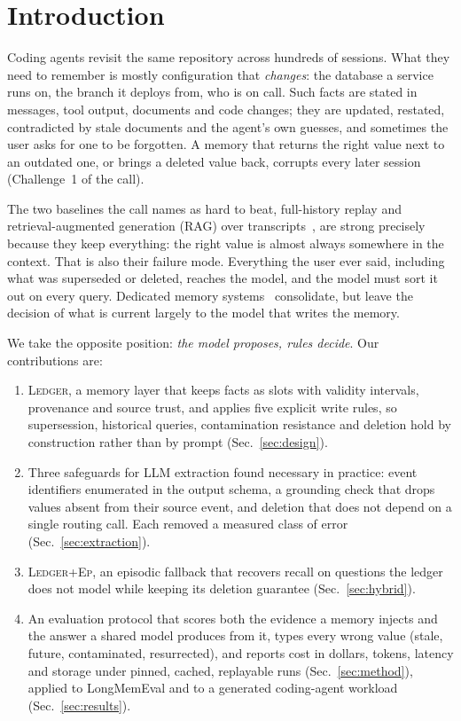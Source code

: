 \documentclass[10pt,conference]{IEEEtran}
\newcommand{\sys}{\textsc{Ledger}}
\newcommand{\hyb}{\textsc{Ledger+Ep}}
\begin{document}
\section{Introduction}

Coding agents revisit the same repository across hundreds of sessions. What
they need to remember is mostly configuration that \emph{changes}: the
database a service runs on, the branch it deploys from, who is on call. Such
facts are stated in messages, tool output, documents and code changes; they
are updated, restated, contradicted by stale documents and the agent's own
guesses, and sometimes the user asks for one to be forgotten. A memory that
returns the right value next to an outdated one, or brings a deleted value
back, corrupts every later session (Challenge~1 of the call).

The two baselines the call names as hard to beat, full-history replay and
retrieval-augmented generation (RAG) over transcripts~\cite{hu2025memoryagentbench,wu2025longmemeval},
are strong precisely because they keep everything: the right value is almost
always somewhere in the context. That is also their failure mode. Everything
the user ever said, including what was superseded or deleted, reaches the
model, and the model must sort it out on every query. Dedicated memory
systems~\cite{packer2023memgpt,chhikara2025mem0,rasmussen2025zep,xu2025amem}
consolidate, but leave the decision of what is current largely to the model
that writes the memory.

We take the opposite position: \emph{the model proposes, rules decide}. Our
contributions are:
\begin{enumerate}
\item \sys{}, a memory layer that keeps facts as slots with validity
  intervals, provenance and source trust, and applies five explicit write
  rules, so supersession, historical queries, contamination resistance and
  deletion hold by construction rather than by prompt (Sec.~\ref{sec:design}).
\item Three safeguards for LLM extraction found necessary in practice:
  event identifiers enumerated in the output schema, a grounding check that
  drops values absent from their source event, and deletion that does not
  depend on a single routing call. Each removed a measured class of error
  (Sec.~\ref{sec:extraction}).
\item \hyb{}, an episodic fallback that recovers recall on questions the
  ledger does not model while keeping its deletion guarantee
  (Sec.~\ref{sec:hybrid}).
\item An evaluation protocol that scores both the evidence a memory injects
  and the answer a shared model produces from it, types every wrong value
  (stale, future, contaminated, resurrected), and reports cost in dollars,
  tokens, latency and storage under pinned, cached, replayable runs
  (Sec.~\ref{sec:method}), applied to LongMemEval and to a generated coding-agent
  workload (Sec.~\ref{sec:results}).
\end{enumerate}
\end{document}
